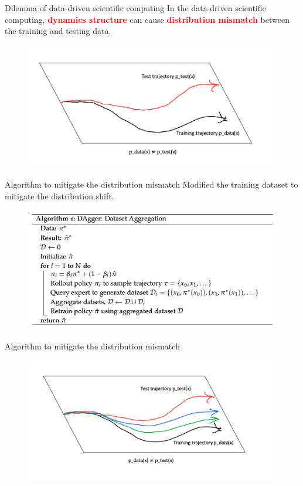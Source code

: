 \documentclass{beamer}
\begin{document}
\begin{frame}{Dilemma of data-driven scientific computing}
	In the data-driven scientific computing, \textcolor{red}{\textbf{dynamics structure}} can cause \textcolor{red}{\textbf{distribution mismatch}} between the training and testing data.
	\begin{figure}[H]
          \centering
          \centerline{\includegraphics[width=\linewidth]{fig/dilemma.png}}
        \end{figure}
\end{frame}


\begin{frame}{Algorithm to mitigate the distribution mismatch}
	Modified the training dataset to mitigate the distribution shift.
	\begin{figure}[H]
          \centering
          \centerline{\includegraphics[width=\linewidth]{fig/DAgger.png}}
        \end{figure}
\end{frame}


\begin{frame}{Algorithm to mitigate the distribution mismatch}
	\begin{figure}[H]
          \centering
          \centerline{\includegraphics[width=\linewidth]{fig/DAggerpic.png}}
        \end{figure}
\end{frame}
\end{document}
